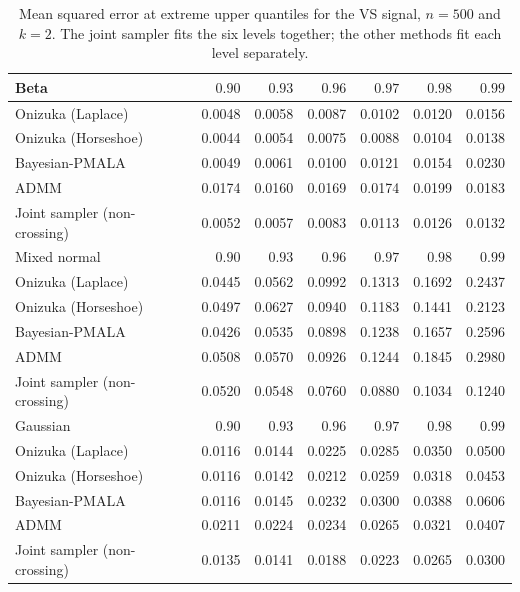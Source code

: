 \begin{table}[!htbp]
\centering
\small
\caption{Mean squared error at extreme upper quantiles for the VS signal, $n=500$ and $k=2$. The joint sampler fits the six levels together; the other methods fit each level separately.}
\label{tab:vs_ext_upper_mse}
\begin{tabular}{lrrrrrr}
\toprule
Beta & $0.90$ & $0.93$ & $0.96$ & $0.97$ & $0.98$ & $0.99$ \\
\midrule
Onizuka (Laplace) & 0.0048 & 0.0058 & 0.0087 & 0.0102 & 0.0120 & 0.0156 \\
Onizuka (Horseshoe) & 0.0044 & 0.0054 & 0.0075 & 0.0088 & 0.0104 & 0.0138 \\
Bayesian-PMALA & 0.0049 & 0.0061 & 0.0100 & 0.0121 & 0.0154 & 0.0230 \\
ADMM & 0.0174 & 0.0160 & 0.0169 & 0.0174 & 0.0199 & 0.0183 \\
Joint sampler (non-crossing) & 0.0052 & 0.0057 & 0.0083 & 0.0113 & 0.0126 & 0.0132 \\
\midrule
Mixed normal & $0.90$ & $0.93$ & $0.96$ & $0.97$ & $0.98$ & $0.99$ \\
\midrule
Onizuka (Laplace) & 0.0445 & 0.0562 & 0.0992 & 0.1313 & 0.1692 & 0.2437 \\
Onizuka (Horseshoe) & 0.0497 & 0.0627 & 0.0940 & 0.1183 & 0.1441 & 0.2123 \\
Bayesian-PMALA & 0.0426 & 0.0535 & 0.0898 & 0.1238 & 0.1657 & 0.2596 \\
ADMM & 0.0508 & 0.0570 & 0.0926 & 0.1244 & 0.1845 & 0.2980 \\
Joint sampler (non-crossing) & 0.0520 & 0.0548 & 0.0760 & 0.0880 & 0.1034 & 0.1240 \\
\midrule
Gaussian & $0.90$ & $0.93$ & $0.96$ & $0.97$ & $0.98$ & $0.99$ \\
\midrule
Onizuka (Laplace) & 0.0116 & 0.0144 & 0.0225 & 0.0285 & 0.0350 & 0.0500 \\
Onizuka (Horseshoe) & 0.0116 & 0.0142 & 0.0212 & 0.0259 & 0.0318 & 0.0453 \\
Bayesian-PMALA & 0.0116 & 0.0145 & 0.0232 & 0.0300 & 0.0388 & 0.0606 \\
ADMM & 0.0211 & 0.0224 & 0.0234 & 0.0265 & 0.0321 & 0.0407 \\
Joint sampler (non-crossing) & 0.0135 & 0.0141 & 0.0188 & 0.0223 & 0.0265 & 0.0300 \\
\bottomrule
\end{tabular}
\end{table}
